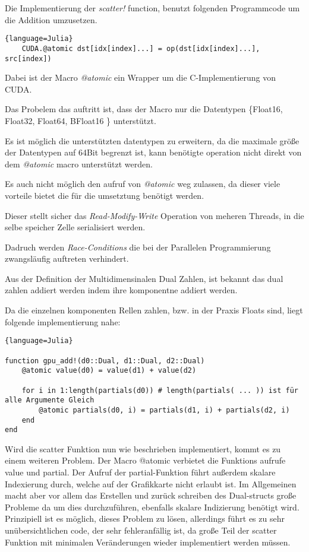 Die Implementierung der \textit{scatter!} function, benutzt folgenden Programmcode um die 
Addition umzusetzen. 

\begin{lstlisting}{language=Julia}
	CUDA.@atomic dst[idx[index]...] = op(dst[idx[index]...], src[index])
\end{lstlisting}


Dabei ist der Macro \textit{@atomic} ein Wrapper um die C-Implementierung von CUDA.

Das Probelem das auftritt ist, dass der Macro nur die Datentypen \{Float16, Float32, Float64, BFloat16 \}
unterstützt.

Es ist möglich die unterstützten datentypen zu erweitern, da die maximale größe der Datentypen auf 64Bit
begrenzt ist, kann benötigte operation nicht direkt von dem \textit{@atomic} macro unterstützt werden.

Es auch nicht möglich den aufruf von \textit{@atomic} weg zulassen, da dieser viele vorteile bietet
die für die umsetztung benötigt werden.

Dieser stellt sicher das \textit{Read-Modify-Write} Operation von meheren Threads, in die selbe
speicher Zelle serialisiert werden.

Dadruch werden \textit{Race-Conditions} die bei der Parallelen Programmierung zwangsläufig auftreten 
verhindert.

Aus der Definition der Multidimensinalen Dual Zahlen, ist bekannt das dual zahlen addiert werden 
indem ihre komponentne addiert werden.

Da die einzelnen komponenten Rellen zahlen, 
bzw. in der Praxis Floats sind, liegt folgende implementierung nahe:

\begin{lstlisting}{language=Julia}

function gpu_add!(d0::Dual, d1::Dual, d2::Dual)
	@atomic value(d0) = value(d1) + value(d2)
	
	for i in 1:length(partials(d0)) # length(partials( ... )) ist für alle Argumente Gleich
		@atomic partials(d0, i) = partials(d1, i) + partials(d2, i)
	end
end

\end{lstlisting}

Wird die scatter Funktion nun wie beschrieben implementiert, kommt es zu einem weiteren Problem.
Der Macro @atomic verbietet die Funktions aufrufe value und partial.
Der Aufruf der partial-Funktion führt außerdem skalare Indexierung durch, welche auf der Grafikkarte nicht erlaubt ist.
Im Allgemeinen macht aber vor allem das Erstellen und zurück schreiben des Dual-structs große Probleme
da um dies durchzuführen, ebenfalls skalare Indizierung benötigt wird.
Prinzipiell ist es möglich, dieses Problem zu lösen, 
allerdings führt es zu sehr unübersichtlichen code, der sehr fehleranfällig ist, 
da große Teil der scatter Funktion mit minimalen Veränderungen wieder implementiert werden müssen.

